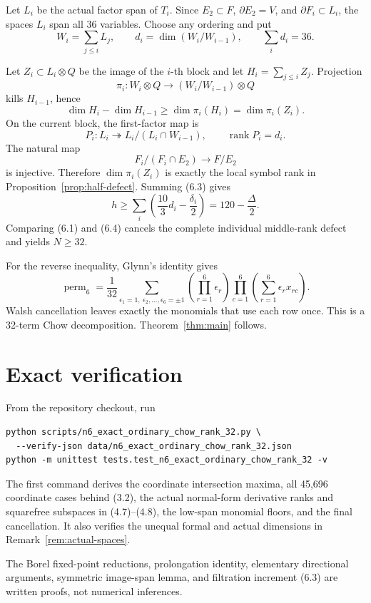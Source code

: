\documentclass[11pt]{amsart}
\newcommand{\rank}{\operatorname{rank}}
\newcommand{\perm}{\operatorname{perm}}
\theoremstyle{definition}
\begin{document}
Let \(L_i\) be the actual factor span of \(T_i\). Since
\(E_2\subset F\), \(\partial E_2=V\), and \(\partial F_i\subset L_i\),
the spaces \(L_i\) span all 36 variables. Choose any ordering and put
\[
 W_i=\sum_{j\le i}L_j,
 \qquad d_i=\dim(W_i/W_{i-1}),
 \qquad\sum_i d_i=36.
\]

Let \(Z_i\subset L_i\otimes Q\) be the image of the \(i\)-th block and
let \(H_i=\sum_{j\le i}Z_j\). Projection
\[
 \pi_i:W_i\otimes Q\longrightarrow(W_i/W_{i-1})\otimes Q
\]
kills \(H_{i-1}\), hence
\[
 \dim H_i-\dim H_{i-1}\ge\dim\pi_i(H_i)=\dim\pi_i(Z_i). \tag{6.3}
\]
On the current block, the first-factor map is
\[
 P_i:L_i\twoheadrightarrow L_i/(L_i\cap W_{i-1}),
 \qquad\rank P_i=d_i.
\]
The natural map
\[
 F_i/(F_i\cap E_2)\longrightarrow F/E_2
\]
is injective. Therefore \(\dim\pi_i(Z_i)\) is exactly the local symbol rank
in Proposition~\ref{prop:half-defect}. Summing (6.3) gives
\[
 \boxed{h\ge\sum_i\left(\frac{10}{3}d_i-\frac{\delta_i}{2}\right)
 =120-\frac\Delta2.} \tag{6.4}
\]
Comparing (6.1) and (6.4) cancels the complete individual middle-rank defect
and yields \(N\ge32\).

For the reverse inequality, Glynn's identity \cite{Glynn2010} gives
\[
 \perm_6=\frac1{32}
 \sum_{\epsilon_1=1,\ \epsilon_2,\ldots,\epsilon_6=\pm1}
 \left(\prod_{r=1}^6\epsilon_r\right)
 \prod_{c=1}^6\left(\sum_{r=1}^6\epsilon_rx_{rc}\right).
\]
Walsh cancellation leaves exactly the monomials that use each row once. This
is a 32-term Chow decomposition. Theorem~\ref{thm:main} follows.

\section{Exact verification}

From the repository checkout, run
\begin{verbatim}
python scripts/n6_exact_ordinary_chow_rank_32.py \
  --verify-json data/n6_exact_ordinary_chow_rank_32.json
python -m unittest tests.test_n6_exact_ordinary_chow_rank_32 -v
\end{verbatim}
The first command derives the coordinate intersection maxima, all 45,696
coordinate cases behind (3.2), the actual normal-form derivative ranks and
squarefree subspaces in (4.7)--(4.8), the low-span monomial floors, and the
final cancellation. It also verifies the unequal formal and actual dimensions
in Remark~\ref{rem:actual-spaces}.

The Borel fixed-point reductions, prolongation identity, elementary
directional arguments, symmetric image-span lemma, and filtration increment
(6.3) are written proofs, not numerical inferences.
\end{document}
